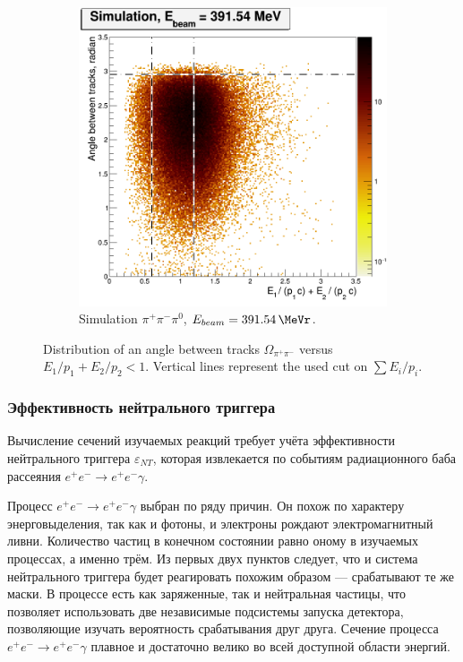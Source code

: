 \begin{figure}[htbp]
\begin{subfigure}[b]{0.45\textwidth}
        \includegraphics[width=\textwidth]{img/raskl_vs_sumEP_sim391_54.png}
        \caption{Simulation $\pi^+ \pi^- \pi^0$, $E_{beam} = \SI{391.54}{\MeVr}$.}
        \label{fig:raskl_sim391_54}
    \end{subfigure}
    \caption{Distribution of an angle between tracks $\Omega_{\pi^+ \pi^-}$ versus $E_1/p_1 + E_2 / p_2 < 1$.
    Vertical lines represent the used cut on $\sum E_i / p_i$.}\label{fig:raskl}
\end{figure}




\subsubsection{Эффективность нейтрального триггера}

Вычисление сечений изучаемых реакций требует учёта эффективности нейтрального триггера $\varepsilon_{NT}$,
которая извлекается по событиям радиационного баба рассеяния $e^+e^- \to e^+e^-\gamma$.


Процесс $e^+e^- \to e^+e^-\gamma$ выбран по ряду причин.
Он похож по характеру энерговыделения,
так как и фотоны,
и электроны рождают электромагнитный ливни.
Количество частиц в конечном состоянии равно оному в изучаемых процессах,
а именно трём.
Из первых двух пунктов следует,
что и система нейтрального триггера будет реагировать похожим образом
---
срабатывают те же маски.
В процессе есть как заряженные,
так и нейтральная частицы,
что позволяет использовать две независимые подсистемы запуска детектора,
позволяющие изучать вероятность срабатывания друг друга.
Сечение процесса $e^+e^- \to e^+e^-\gamma$ плавное и достаточно велико во всей доступной области энергий.


